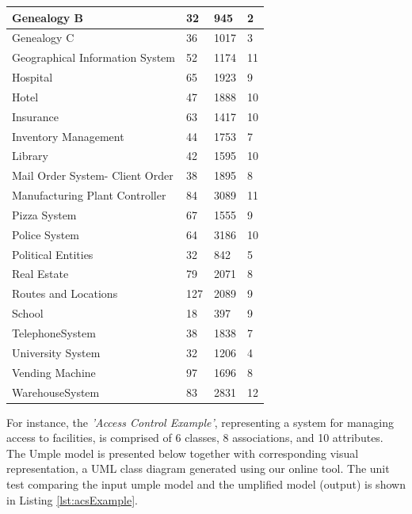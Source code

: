 \begin{table}[h]
\begin{tabularx}{\textwidth}{l|YYY}
Genealogy B & 32 & 945 & 2\\ \hline
Genealogy C & 36 & 1017 & 3\\ \hline
Geographical Information System & 52 & 1174 & 11\\ \hline
Hospital & 65 & 1923 & 9\\ \hline
Hotel & 47 & 1888 & 10\\ \hline
Insurance & 63 & 1417 & 10\\ \hline
Inventory Management & 44 & 1753 & 7\\ \hline
Library & 42 & 1595 & 10\\ \hline
Mail Order System- Client Order & 38 & 1895 & 8\\ \hline
Manufacturing Plant Controller & 84 & 3089 & 11\\ \hline
Pizza System & 67 & 1555 & 9 \\ \hline
Police System & 64 & 3186 & 10\\ \hline
Political Entities & 32 & 842 & 5\\ \hline
Real Estate & 79 & 2071 & 8\\ \hline
Routes and Locations & 127 & 2089 & 9\\ \hline
School & 18 & 397 & 9\\ \hline
TelephoneSystem & 38 & 1838 & 7\\ \hline
University System & 32 & 1206 & 4\\ \hline
Vending Machine & 97 & 1696 & 8\\ \hline
WarehouseSystem & 83 & 2831 & 12\\ \hline

\hline
\end{tabularx}
\end{table}

For instance, the \textit{'Access Control Example'}, representing a system for managing access to facilities, is comprised of 6 classes, 8 associations, and 10 attributes. The Umple model is presented below together with corresponding visual representation, a UML class diagram generated using our online tool. The unit test comparing the input umple model and the umplified model (output) is shown in Listing \ref{lst:acsExample}.

